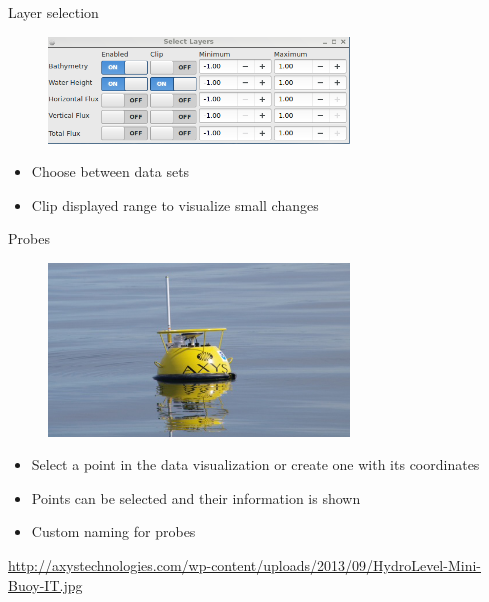\documentclass[shortpres,usenames,dvipsnames]{beamer}
\begin{document}
\begin{frame}[fragile]{Layer selection}
	\begin{figure}
		\includegraphics[clip, width=80mm]{img/layerselect.png}
	\end{figure}
	\begin{itemize}
		\item Choose between data sets
		\item Clip displayed range to visualize small changes
	\end{itemize}
\end{frame}

\begin{frame}[fragile]{Probes}
	\begin{figure}
		\includegraphics[clip, width=80mm]{img/Buoy.jpg}
	\end{figure}
	\begin{itemize}
		\item Select a point in the data visualization or create one with its coordinates
		\item Points can be selected and their information is shown
		\item Custom naming for probes
	\end{itemize}
	\vfill
	\flushleft
	{\fontsize{5}{5} \selectfont \url{http://axystechnologies.com/wp-content/uploads/2013/09/HydroLevel-Mini-Buoy-IT.jpg}}
\end{frame}
\end{document}

